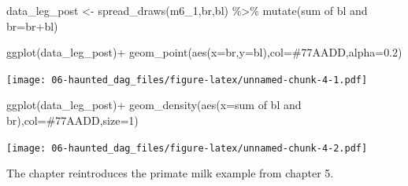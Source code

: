 \documentclass[
]{book}
\newenvironment{Shaded}{\begin{snugshade}}{\end{snugshade}}
\newcommand{\AttributeTok}[1]{\textcolor[rgb]{0.77,0.63,0.00}{#1}}
\newcommand{\DecValTok}[1]{\textcolor[rgb]{0.00,0.00,0.81}{#1}}
\newcommand{\FloatTok}[1]{\textcolor[rgb]{0.00,0.00,0.81}{#1}}
\newcommand{\FunctionTok}[1]{\textcolor[rgb]{0.00,0.00,0.00}{#1}}
\newcommand{\NormalTok}[1]{#1}
\newcommand{\OtherTok}[1]{\textcolor[rgb]{0.56,0.35,0.01}{#1}}
\newcommand{\SpecialCharTok}[1]{\textcolor[rgb]{0.00,0.00,0.00}{#1}}
\newcommand{\StringTok}[1]{\textcolor[rgb]{0.31,0.60,0.02}{#1}}
\begin{document}
\begin{Shaded}
\begin{Highlighting}[]
\NormalTok{data\_leg\_post }\OtherTok{\textless{}{-}} \FunctionTok{spread\_draws}\NormalTok{(m6\_1,br,bl) }\SpecialCharTok{\%\textgreater{}\%}
  \FunctionTok{mutate}\NormalTok{(}\StringTok{\textasciigrave{}}\AttributeTok{sum of bl and br}\StringTok{\textasciigrave{}}\OtherTok{=}\NormalTok{br}\SpecialCharTok{+}\NormalTok{bl)}

\FunctionTok{ggplot}\NormalTok{(data\_leg\_post)}\SpecialCharTok{+}
  \FunctionTok{geom\_point}\NormalTok{(}\FunctionTok{aes}\NormalTok{(}\AttributeTok{x=}\NormalTok{br,}\AttributeTok{y=}\NormalTok{bl),}\AttributeTok{col=}\StringTok{\textquotesingle{}\#77AADD\textquotesingle{}}\NormalTok{,}\AttributeTok{alpha=}\FloatTok{0.2}\NormalTok{)}
\end{Highlighting}
\end{Shaded}

\texttt{[image: 06-haunted\_dag\_files/figure-latex/unnamed-chunk-4-1.pdf]}

\begin{Shaded}
\begin{Highlighting}[]
\FunctionTok{ggplot}\NormalTok{(data\_leg\_post)}\SpecialCharTok{+}
  \FunctionTok{geom\_density}\NormalTok{(}\FunctionTok{aes}\NormalTok{(}\AttributeTok{x=}\StringTok{\textasciigrave{}}\AttributeTok{sum of bl and br}\StringTok{\textasciigrave{}}\NormalTok{),}\AttributeTok{col=}\StringTok{\textquotesingle{}\#77AADD\textquotesingle{}}\NormalTok{,}\AttributeTok{size=}\DecValTok{1}\NormalTok{)}
\end{Highlighting}
\end{Shaded}

\texttt{[image: 06-haunted\_dag\_files/figure-latex/unnamed-chunk-4-2.pdf]}

The chapter reintroduces the primate milk example from chapter 5.
\end{document}

